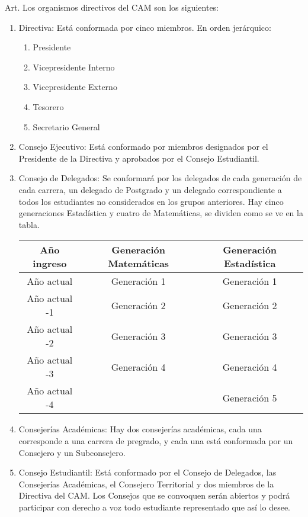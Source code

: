 \documentclass[letterpaper,11pt]{article}
\newcounter{art}
\newenvironment{art}{
    Art.\refstepcounter{art} \theart\:
}{}
\begin{document}
\begin{art}\label{definicionesOrganismos}
    Los organismos directivos del CAM son los siguientes:
    \begin{enumerate}
        \item Directiva: Está conformada por cinco miembros. En orden jerárquico:
              \begin{enumerate}
                  \item Presidente
                  \item Vicepresidente Interno
                  \item Vicepresidente Externo
                  \item Tesorero
                  \item Secretario General
              \end{enumerate}
        \item Consejo Ejecutivo: Está conformado por miembros designados por el Presidente de la Directiva y aprobados por el Consejo Estudiantil.
        \item Consejo de Delegados: Se conformará por los delegados de cada generación de cada carrera, un delegado de Postgrado y un delegado correspondiente a todos los estudiantes no considerados en los grupos anteriores. Hay cinco generaciones Estadística y cuatro de Matemáticas, se dividen como se ve en la tabla.
              \begin{center}
                  \begin{tabular}{|c|c|c|}
                      \hline
                      Año ingreso   & Generación Matemáticas & Generación Estadística \\
                      \hline
                      Año actual    & Generación 1           & Generación 1           \\
                      Año actual -1 & Generación 2           & Generación 2           \\
                      Año actual -2 & Generación 3           & Generación 3           \\
                      Año actual -3 & Generación 4           & Generación 4           \\
                      Año actual -4 &                        & Generación 5           \\
                      \hline
                  \end{tabular}
              \end{center} %
        \item Consejerías Académicas: Hay dos consejerías académicas, cada una corresponde a una carrera de pregrado, y cada una está conformada por un Consejero y un Subconsejero.
        \item Consejo Estudiantil: Está conformado por el Consejo de Delegados, las Consejerías Académicas, el Consejero Territorial y dos miembros de la Directiva del CAM. Los Consejos que se convoquen serán abiertos y podrá participar con derecho a voz todo estudiante representado que así lo desee.
    \end{enumerate}
\end{art}
\end{document}
